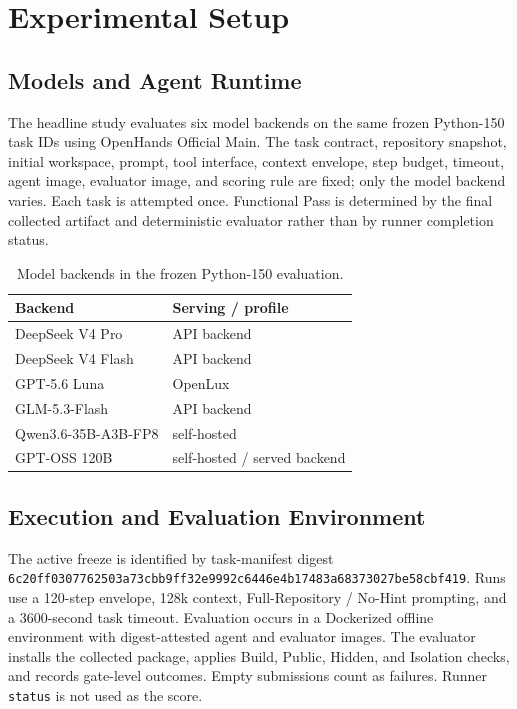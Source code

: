 \documentclass[acmsmall,screen,review,anonymous]{acmart}
\begin{document}
\section{Experimental Setup}
\label{sec:experimental-setup}

\subsection{Models and Agent Runtime}

The headline study evaluates six model backends on the same frozen Python-150 task
IDs using OpenHands Official Main. The task contract, repository snapshot, initial
workspace, prompt, tool interface, context envelope, step budget, timeout, agent
image, evaluator image, and scoring rule are fixed; only the model backend varies.
Each task is attempted once. Functional Pass is determined by the final collected
artifact and deterministic evaluator rather than by runner completion status.

\begin{table}[t]
  \caption{Model backends in the frozen Python-150 evaluation.}
  \label{tab:models}
  \centering
  \begin{tabular}{ll}
    \toprule
    \textbf{Backend} & \textbf{Serving / profile} \\
    \midrule
    DeepSeek V4 Pro & API backend \\
    DeepSeek V4 Flash & API backend \\
    GPT-5.6 Luna & OpenLux \\
    GLM-5.3-Flash & API backend \\
    Qwen3.6-35B-A3B-FP8 & self-hosted \\
    GPT-OSS 120B & self-hosted / served backend \\
    \bottomrule
  \end{tabular}
\end{table}

\subsection{Execution and Evaluation Environment}

The active freeze is identified by task-manifest digest
\texttt{6c20ff0307762503a73cbb9ff32e9992c6446e4b17483a68373027be58cbf419}.
Runs use a 120-step envelope, 128k context, Full-Repository / No-Hint prompting,
and a 3600-second task timeout. Evaluation occurs in a Dockerized offline
environment with digest-attested agent and evaluator images. The evaluator installs
the collected package, applies Build, Public, Hidden, and Isolation checks, and
records gate-level outcomes. Empty submissions count as failures. Runner
\texttt{status} is not used as the score.
\end{document}
